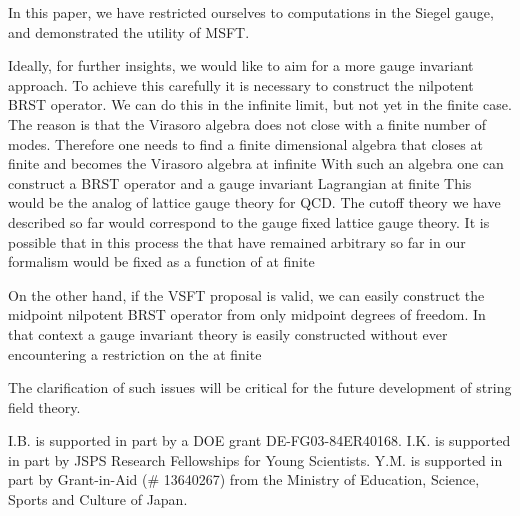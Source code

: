 \documentclass[a4paper,11pt]{article}
\begin{document}
In this paper, we have restricted ourselves to computations in the Siegel
gauge, and demonstrated the utility of MSFT.

Ideally, for further insights, we would like to aim for a more gauge
invariant approach. To achieve this carefully it is necessary to construct
the nilpotent BRST operator. We can do this in the infinite \coordHE{} limit, but
not yet in the finite \coordHE{} case. The reason is that the Virasoro algebra does
not close with a finite number of modes. Therefore one needs to find a
finite dimensional algebra that closes at finite \coordHE{} and becomes the
Virasoro algebra at infinite \coordHE{} With such an algebra one can construct a
BRST operator and a gauge invariant Lagrangian at finite \coordHE{} This would be
the analog of lattice gauge theory for QCD. The cutoff theory we have
described so far would correspond to the gauge fixed lattice gauge theory.
It is possible that in this process the \coordHE{} that have remained arbitrary so far in our formalism would be
fixed as a function of \coordHE{} at finite \coordHE{}

On the other hand, if the VSFT proposal is valid, we can easily construct
the midpoint nilpotent BRST operator from only midpoint degrees of freedom.
In that context a gauge invariant theory is easily constructed without ever
encountering a restriction on the \coordHE{}
at finite \coordHE{}

The clarification of such issues will be critical for the future development
of string field theory.

\begin{center}
\end{center}

I.B. is supported in part by a DOE grant DE-FG03-84ER40168. I.K. is
supported in part by JSPS Research Fellowships for Young Scientists. Y.M. is
supported in part by Grant-in-Aid (\# 13640267) from the Ministry of
Education, Science, Sports and Culture of Japan.
\end{document}
